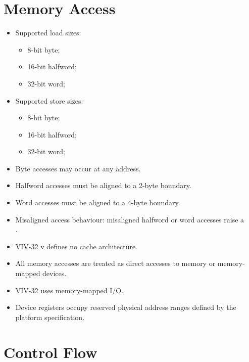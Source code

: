 \section{Memory Access}

\begin{itemize}
  \item Supported load sizes:
  \begin{itemize}
    \item 8-bit byte;
    \item 16-bit halfword;
    \item 32-bit word;
  \end{itemize}
  \item Supported store sizes:
  \begin{itemize}
    \item 8-bit byte;
    \item 16-bit halfword;
    \item 32-bit word;
  \end{itemize}
  \item Byte accesses may occur at any address.
  \item Halfword accesses must be aligned to a 2-byte boundary.
  \item Word accesses must be aligned to a 4-byte boundary.
  \item Misaligned access behaviour: misaligned halfword or word accesses raise
        a\\
        .
  \item VIV-32 v\version{} defines no cache architecture.
  \item All memory accesses are treated as direct accesses to memory or
        memory-mapped devices.
  \item VIV-32 uses memory-mapped I/O.
  \item Device registers occupy reserved physical address ranges defined by the
        platform specification.
\end{itemize}

\section{Control Flow}

